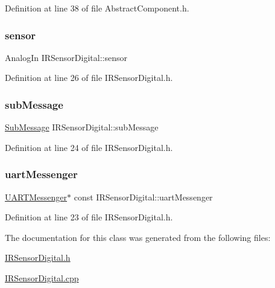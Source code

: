 Definition at line 38 of file Abstract\+Component.\+h.

\mbox{\label{class_i_r_sensor_digital_a8b0c7fe2d6e9f575d589342648868235}} 
\subsubsection{\texorpdfstring{sensor}{sensor}}
{\footnotesize\ttfamily Analog\+In I\+R\+Sensor\+Digital\+::sensor\hspace{0.3cm}{\ttfamily [private]}}



Definition at line 26 of file I\+R\+Sensor\+Digital.\+h.

\mbox{\label{class_i_r_sensor_digital_a930d64f72308a44d9be143d1eb8c77a1}} 
\subsubsection{\texorpdfstring{sub\+Message}{subMessage}}
{\footnotesize\ttfamily \hyperlink{struct_sub_message}{Sub\+Message} I\+R\+Sensor\+Digital\+::sub\+Message\hspace{0.3cm}{\ttfamily [private]}}



Definition at line 24 of file I\+R\+Sensor\+Digital.\+h.

\mbox{\label{class_i_r_sensor_digital_a4890a7142a916a4d1ef70d7ebbe79f77}} 
\subsubsection{\texorpdfstring{uart\+Messenger}{uartMessenger}}
{\footnotesize\ttfamily \hyperlink{class_u_a_r_t_messenger}{U\+A\+R\+T\+Messenger}$\ast$ const I\+R\+Sensor\+Digital\+::uart\+Messenger\hspace{0.3cm}{\ttfamily [private]}}



Definition at line 23 of file I\+R\+Sensor\+Digital.\+h.



The documentation for this class was generated from the following files\+:\begin{DoxyCompactItemize}
\item 
\hyperlink{_i_r_sensor_digital_8h}{I\+R\+Sensor\+Digital.\+h}\item 
\hyperlink{_i_r_sensor_digital_8cpp}{I\+R\+Sensor\+Digital.\+cpp}\end{DoxyCompactItemize}
